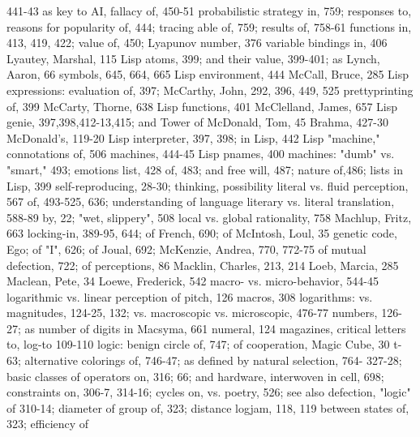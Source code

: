   441-43 as key to AI, fallacy of, 450-51            probabilistic strategy in, 759; responses to,
  reasons for popularity of, 444; tracing            able of, 759; results of, 758-61
  functions in, 413, 419, 422; value of, 450;       Lyapunov number, 376
  variable bindings in, 406                         Lyautey, Marshal, 115
Lisp atoms, 399; and their value, 399-401; as       Lynch, Aaron, 66
  symbols, 645, 664, 665
Lisp environment, 444                               McCall, Bruce, 285
Lisp expressions: evaluation of, 397;               McCarthy, John, 292, 396, 449, 525
  prettyprinting of, 399                            McCarty, Thorne, 638
Lisp functions, 401                                 McClelland, James, 657
Lisp genie, 397,398,412-13,415; and Tower of        McDonald, Tom, 45
  Brahma, 427-30                                    McDonald's, 119-20
Lisp interpreter, 397, 398; in Lisp, 442 Lisp       "machine," connotations of, 506
  machines, 444-45 Lisp pnames, 400                 machines: "dumb" vs. "smart," 493; emotions
list, 428                                            of, 483; and free will, 487; nature of,486;
lists in Lisp, 399                                   self-reproducing, 28-30; thinking, possibility
literal vs. fluid perception, 567                    of, 493-525, 636; understanding of language
literary vs. literal translation, 588-89             by, 22; "wet, slippery", 508
local vs. global rationality, 758                   Machlup, Fritz, 663
locking-in, 389-95, 644; of French, 690; of         McIntosh, Loul, 35
  genetic code, Ego; of "I", 626; of Joual, 692;    McKenzie, Andrea, 770, 772-75
  of mutual defection, 722; of perceptions, 86      Macklin, Charles, 213, 214
Loeb, Marcia, 285                                   Maclean, Pete, 34
Loewe, Frederick, 542                               macro- vs. micro-behavior, 544-45
logarithmic vs. linear perception of pitch, 126     macros, 308
logarithms: vs. magnitudes, 124-25, 132; vs.        macroscopic vs. microscopic, 476-77
  numbers, 126-27; as number of digits in           Macsyma, 661
  numeral, 124                                      magazines, critical letters to, log-to 109-110
logic: benign circle of, 747; of cooperation,       Magic Cube, 30 t-63; alternative colorings of,
  746-47; as defined by natural selection, 764-      327-28; basic classes of operators on, 316;
  66; and hardware, interwoven in cell, 698;         constraints on, 306-7, 314-16; cycles on,
  vs. poetry, 526; see also defection, "logic" of    310-14; diameter of group of, 323; distance
logjam, 118, 119                                     between states of, 323; efficiency of
